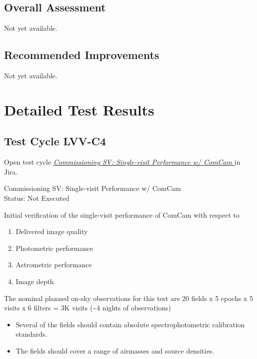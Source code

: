 \documentclass[DM,lsstdraft,STR,toc]{lsstdoc}
\providecommand{\tightlist}{
  \setlength{\itemsep}{0pt}\setlength{\parskip}{0pt}}
\begin{document}
\subsection{Overall Assessment}
\label{sect:overallassessment}

Not yet available.

\subsection{Recommended Improvements}
\label{sect:recommendations}

Not yet available.

\newpage
\section{Detailed Test Results}
\label{sect:detailedtestresults}


  \subsection{Test Cycle LVV-C4 }

Open test cycle {\it \href{https://jira.lsstcorp.org/secure/Tests.jspa#/testrun/LVV-C4}{Commissioning SV: Single-visit Performance w/ ComCam
}} in Jira.

  Commissioning SV: Single-visit Performance w/ ComCam
\\
  Status: Not Executed

  Initial verification of the single-visit performance of ComCam with
respect to

\begin{enumerate}
\tightlist
\item
  Delivered image quality
\item
  Photometric performance
\item
  Astrometric performance
\item
  Image depth
\end{enumerate}

The nominal planned on-sky observations for this test are 20 fields x 5
epochs x 5 visits x 6 filters = 3K visits (\textasciitilde{}4 nights of
observations)

\begin{itemize}
\tightlist
\item
  Several of the fields should contain absolute spectrophotometric
  calibration standards.
\item
  The fields should cover a range of airmasses and source densities.
\end{itemize}
\end{document}
